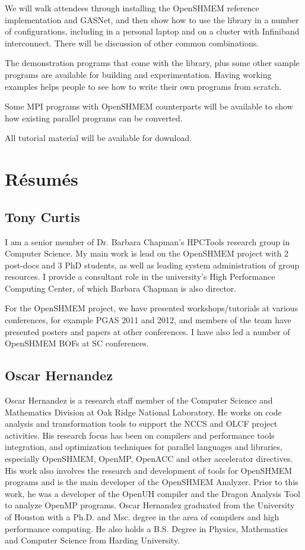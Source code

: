 \documentclass[10pt,english]{article}
\begin{document}
We will walk attendees through installing the OpenSHMEM reference
implementation and GASNet, and then show how to use the library in a
number of configurations, including in a personal laptop and on a
cluster with Infiniband interconnect.  There will be discussion of
other common combinations.

The demonstration programs that come with the library, plus some other
sample programs are available for building and experimentation.
Having working examples helps people to see how to write their own
programs from scratch.

Some MPI programs with OpenSHMEM counterparts will be available to
show how existing parallel programs can be converted.

All tutorial material will be available for download.

\section{R\'{e}sum\'{e}s}

\subsection{Tony Curtis}

    I am a senior member of Dr. Barbara Chapman's HPCTools research
    group in Computer Science.  My main work is lead on the OpenSHMEM
    project with 2 post-docs and 3 PhD students, as well as leading
    system administration of group resources.  I provide a consultant
    role in the university's High Performance Computing Center, of
    which Barbara Chapman is also director.

    For the OpenSHMEM project, we have presented workshops/tutorials
    at various conferences, for example PGAS 2011 and 2012, and
    members of the team have presented posters and papers at other
    conferences.  I have also led a number of OpenSHMEM BOFs at SC
    conferences.

\subsection{Oscar Hernandez}

    Oscar Hernandez is a research staff member of the Computer Science
    and Mathematics Division at Oak Ridge National Laboratory. He
    works on code analysis and transformation tools to support the
    NCCS and OLCF project activities. His research focus has been on
    compilers and performance tools integration, and optimization
    techniques for parallel languages and libraries, especially
    OpenSHMEM, OpenMP, OpenACC and other accelerator directives. His
    work also involves the research and development of tools for
    OpenSHMEM programs and is the main developer of the OpenSHMEM
    Analyzer. Prior to this work, he was a developer of the OpenUH
    compiler and the Dragon Analysis Tool to analyze OpenMP
    programs. Oscar Hernandez graduated from the University of Houston
    with a Ph.D. and Msc. degree in the area of compilers and high
    performance computing. He also holds a B.S.  Degree in Physics,
    Mathematics and Computer Science from Harding University.
\end{document}
